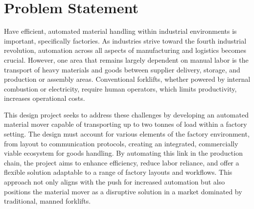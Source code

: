 \documentclass[12pt]{article}
\begin{document}
 





\tableofcontents                                              %
\newpage
 


  
 

\section{Problem Statement}

Have efficient, automated material handling within industrial environments is important, specifically factories. As industries strive toward the fourth industrial revolution, automation across all aspects of manufacturing and logistics becomes crucial. However, one area that remains largely dependent on manual labor is the transport of heavy materials and goods between supplier delivery, storage, and production or assembly areas. Conventional forklifts, whether powered by internal combustion or electricity, require human operators, which limits productivity, increases operational costs.

This design project seeks to address these challenges by developing an automated material mover capable of transporting up to two tonnes of load within a factory setting. The design must account for various elements of the factory environment, from layout to communication protocols, creating an integrated, commercially viable ecosystem for goods handling. By automating this link in the production chain, the project aims to enhance efficiency, reduce labor reliance, and offer a flexible solution adaptable to a range of factory layouts and workflows. This approach not only aligns with the push for increased automation but also positions the material mover as a disruptive solution in a market dominated by traditional, manned forklifts.
\end{document}
